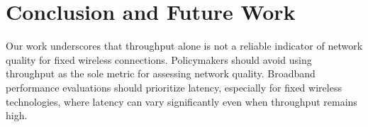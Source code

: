 \section{Conclusion and Future Work} \label{sec:conclusion}

Our work underscores that throughput alone is not a reliable indicator of network quality 
for fixed wireless connections. Policymakers should avoid using throughput as the sole metric 
for assessing network quality. Broadband performance evaluations should prioritize latency, 
especially for fixed wireless technologies, where latency can vary significantly even when 
throughput remains high.